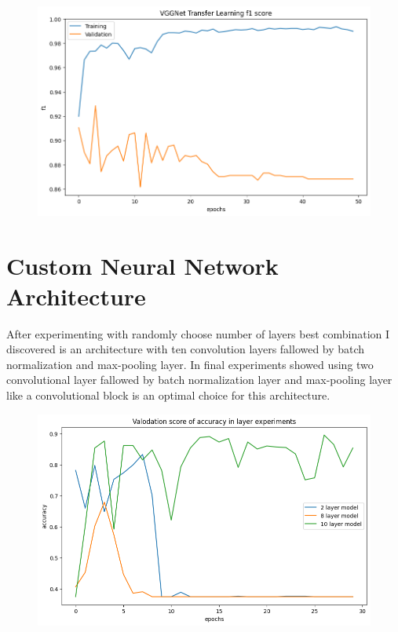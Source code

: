 \begin{figure}[H]
    \centering
    \includegraphics[width=.8\textwidth]{img/vggnettff1.png}
    \caption{}
    \label{fig:vggtff1}
\end{figure}


\section{Custom Neural Network Architecture}
After experimenting with randomly choose number of layers best combination I discovered is an architecture with ten convolution layers fallowed by batch normalization and max-pooling layer. 
In final experiments showed using two convolutional layer fallowed by batch normalization layer and max-pooling layer like a convolutional block is an optimal choice for this architecture.

\begin{figure}[H]
    \centering
    \includegraphics[width=\textwidth]{img/layerexpaccuracy.png}
    \caption{}
    \label{fig:layerexpacc}
\end{figure}

